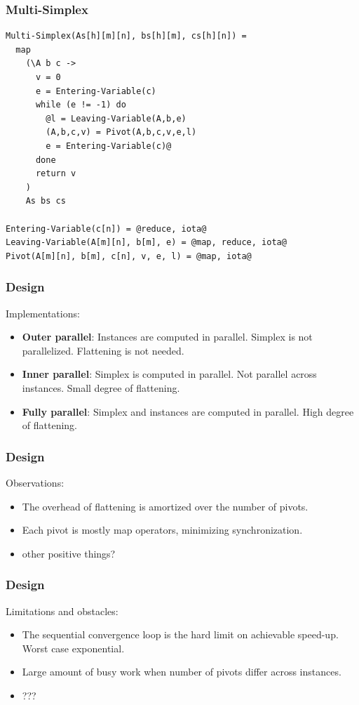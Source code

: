 \documentclass[handout]{beamer}
\begin{document}

\begin{frame}[fragile]
\frametitle{Multi-Simplex}
\begin{lstlisting}
Multi-Simplex(As[h][m][n], bs[h][m], cs[h][n]) =
  map
    (\A b c ->
      v = 0
      e = Entering-Variable(c)
      while (e != -1) do
        @l = Leaving-Variable(A,b,e)
        (A,b,c,v) = Pivot(A,b,c,v,e,l)
        e = Entering-Variable(c)@
      done
      return v
    )
    As bs cs

Entering-Variable(c[n]) = @reduce, iota@
Leaving-Variable(A[m][n], b[m], e) = @map, reduce, iota@
Pivot(A[m][n], b[m], c[n], v, e, l) = @map, iota@
\end{lstlisting}
\end{frame}

\begin{frame}
\frametitle{Design}
Implementations:
\begin{itemize}
	\item \textbf{Outer parallel}: Instances are computed in parallel. Simplex is not parallelized. Flattening is not needed.
	
	\item \textbf{Inner parallel}: Simplex is computed in parallel. Not parallel across instances. Small degree of flattening.
	
	\item \textbf{Fully parallel}: Simplex and instances are computed in parallel. High degree of flattening.
\end{itemize}
\end{frame}

\begin{frame}
\frametitle{Design}
Observations:
\begin{itemize}
	\item The overhead of flattening is amortized over the number of pivots.
	
	\item Each pivot is mostly map operators, minimizing synchronization.
	
	\item other positive things?
\end{itemize}
\end{frame}

\begin{frame}
\frametitle{Design}
Limitations and obstacles:
\begin{itemize}
	\item The sequential convergence loop is the hard limit on achievable speed-up. Worst case exponential. 
	
	\item Large amount of busy work when number of pivots differ across instances.
	
	\item ???
\end{itemize}
\end{frame}
\end{document}

